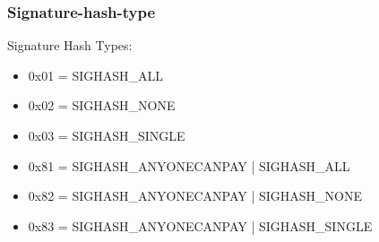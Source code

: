 \subsubsection{Signature-hash-type}

Signature Hash Types:
\begin{itemize}
    \item 0x01 = SIGHASH\_ALL
    \item 0x02 = SIGHASH\_NONE
    \item 0x03 = SIGHASH\_SINGLE
    \item 0x81 = SIGHASH\_ANYONECANPAY | SIGHASH\_ALL
    \item 0x82 = SIGHASH\_ANYONECANPAY | SIGHASH\_NONE
    \item 0x83 = SIGHASH\_ANYONECANPAY | SIGHASH\_SINGLE
\end{itemize}
